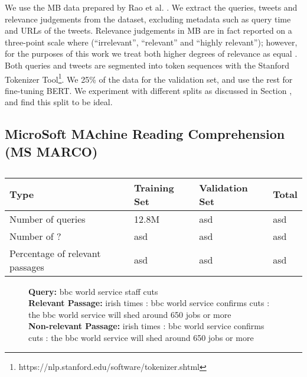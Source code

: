 We use the MB data prepared by Rao et al. \cite{rao2019tweet}.
We extract the queries, tweets and relevance judgements from the dataset, excluding metadata such as query time and URLs of the tweets.
Relevance judgements in MB are in fact reported on a three-point scale where (``irrelevant'', ``relevant'' and ``highly relevant''); however, for the purposes of this work we treat both higher degrees of relevance as equal \cite{ounisoverview}.
Both queries and tweets are segmented into token sequences with the Stanford Tokenizer Tool\footnote{https://nlp.stanford.edu/software/tokenizer.shtml}.
We  25\% of the data for the validation set, and use the rest for fine-tuning BERT.
We experiment with different splits as discussed in Section , and find this split to be ideal.

\subsection{MicroSoft MAchine Reading Comprehension (MS MARCO)}

\begin{table}[b]
\vspace{0.2cm}
\centering
\begin{tabular}{llll}
\toprule
\textbf{Type} \mbox{\hspace{0.5cm}} & \textbf{Training Set} \mbox{\hspace{1.0cm}} & \textbf{Validation Set} \mbox{\hspace{1.0cm}} & \textbf{Total} \mbox{\hspace{1.0cm}} \\
\toprule
Number of queries & 12.8M & asd & asd \\
Number  of ? & asd & asd & asd \\
Percentage of relevant passages  & asd      & asd & asd   \\
\bottomrule
\end{tabular}
\vspace{0.2cm}
\caption{}
\label{tab:marco-stats}
\vspace{-0.6cm}
\end{table}

\begin{figure}[b!]
	\begin{framed}
		\centering
    		\textbf{Query:} bbc world service staff cuts \\
    		\textbf{Relevant Passage:} irish times : bbc world service confirms cuts : the bbc world service will shed around 650 jobs or more \\
    		\textbf{Non-relevant Passage:} irish times : bbc world service confirms cuts : the bbc world service will shed around 650 jobs or more \\
	\end{framed}
\label{marco-example}
 \caption{}
\end{figure}

